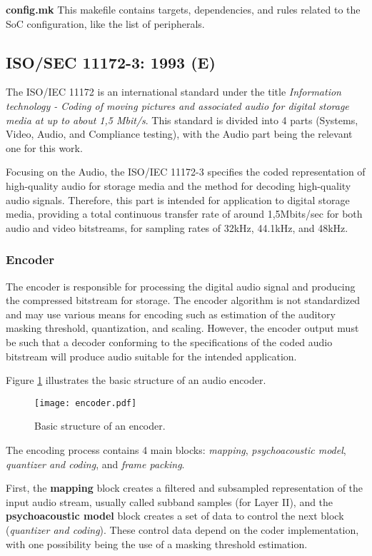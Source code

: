 \textbf{config.mk} This makefile contains targets, dependencies, and rules related to the SoC configuration, like the list of peripherals.

\subsection{ISO/SEC 11172-3: 1993 (E)}

The ISO/IEC 11172 is an international standard under the title \textit{Information technology - Coding of moving pictures and associated audio for digital storage media at up to about 1,5 Mbit/s}. This standard is divided into 4 parts (Systems, Video, Audio, and Compliance testing), with the Audio part being the relevant one for this work.

Focusing on the Audio, the ISO/IEC 11172-3 specifies the coded representation of high-quality audio for storage media and the method for decoding high-quality audio signals. Therefore, this part is intended for application to digital storage media, providing a total continuous transfer rate of around 1,5Mbits/sec for both audio and video bitstreams, for sampling rates of 32kHz, 44.1kHz, and 48kHz.

\subsubsection{Encoder}

The encoder is responsible for processing the digital audio signal and producing the compressed bitstream for storage. The encoder algorithm is not standardized and may use various means for encoding such as estimation of the auditory masking threshold, quantization, and scaling. However, the encoder output must be such that a decoder conforming to the specifications of the coded audio bitstream will produce audio suitable for the intended application.

Figure \ref{fig:encoder} illustrates the basic structure of an audio encoder. 

\begin{figure}[H]
\centerline{\texttt{[image: encoder.pdf]}}
\caption{Basic structure of an encoder.}
\label{fig:encoder}
\end{figure}

The encoding process contains 4 main blocks: \textit{mapping}, \textit{psychoacoustic model}, \textit{quantizer and coding}, and \textit{frame packing}.

First, the \textbf{mapping} block creates a filtered and subsampled representation of the input audio stream, usually called subband samples (for Layer II), and the \textbf{psychoacoustic model} block creates a set of data to control the next block (\textit{quantizer and coding}). These control data depend on the coder implementation, with one possibility being the use of a masking threshold estimation.

